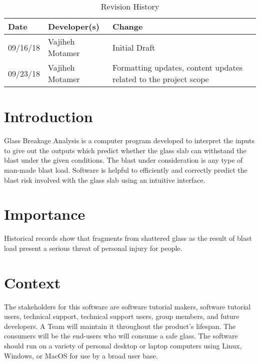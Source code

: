 \documentclass[12pt,letterpaper]{article} \usepackage[utf8]{inputenc}
\begin{document}
\maketitle

\begin{table}[hp] \caption{Revision History} \label{TblRevisionHistory}
\begin{tabularx}{\textwidth}{llX} \toprule \textbf{Date} & \textbf{Developer(s)}
& \textbf{Change}\\ \midrule 09/16/18 & Vajiheh Motamer & Initial Draft\\
09/23/18 & Vajiheh Motamer & Formatting updates, content updates related to the
project scope\\ \bottomrule \end{tabularx} \end{table}


\section{Introduction}Glass Breakage Analysis is a computer program developed to
interpret the inputs to give out the outputs which predict whether the glass
slab can withstand the blast under the given conditions. The blast under
consideration is any type of man-made blast load. Software is helpful to
efficiently and correctly predict the blast risk involved with the glass slab
using an intuitive interface.


\section{Importance} Historical records show that fragments from shattered glass
as the result of blast load present a serious threat of personal injury for
people.


\section{Context}

The stakeholders for this software are software tutorial makers, software
tutorial users, technical support, technical support users, group members, and
future developers. A Team will maintain it throughout the product’s lifespan.
The consumers will be the end-users who will consume a safe glass. The software
should run on a variety of personal desktop or laptop computers using Linux,
Windows, or MacOS for use by a broad user base.


\end{document}

